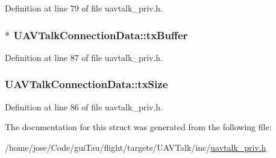 Definition at line 79 of file uavtalk\-\_\-priv.\-h.

\hypertarget{struct_u_a_v_talk_connection_data_a63bb147699417c91ed5176745eb46211}{
\subsubsection[{tx\-Buffer}]{$\ast$ U\-A\-V\-Talk\-Connection\-Data\-::tx\-Buffer}}\label{struct_u_a_v_talk_connection_data_a63bb147699417c91ed5176745eb46211}


Definition at line 87 of file uavtalk\-\_\-priv.\-h.

\hypertarget{struct_u_a_v_talk_connection_data_a1cac6d157b4dbf6d91882833c7ce304c}{
\subsubsection[{tx\-Size}]{ U\-A\-V\-Talk\-Connection\-Data\-::tx\-Size}}\label{struct_u_a_v_talk_connection_data_a1cac6d157b4dbf6d91882833c7ce304c}


Definition at line 86 of file uavtalk\-\_\-priv.\-h.



The documentation for this struct was generated from the following file\-:\begin{DoxyCompactItemize}
\item 
/home/jose/\-Code/gui\-Tau/flight/targets/\-U\-A\-V\-Talk/inc/\hyperlink{uavtalk__priv_8h}{uavtalk\-\_\-priv.\-h}\end{DoxyCompactItemize}
